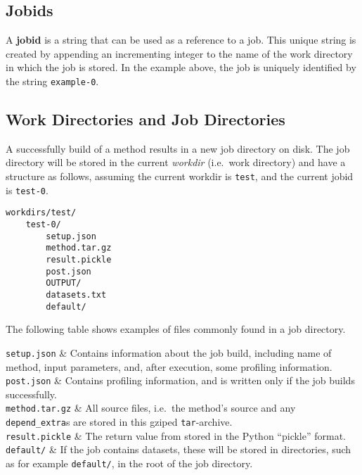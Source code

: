 \subsection{Jobids}
A \textbf{jobid} is a string that can be used as a reference to a job.
This unique string is created by appending an incrementing integer to
the name of the work directory in which the job is stored.  In the
example above, the job is uniquely identified by the
string \texttt{example-0}.



\subsection{Work Directories and Job Directories}
\label{sec:job_directories}
A successfully build of a method results in a new job directory on
disk.  The job directory will be stored in the
current \textsl{workdir} (i.e.\ work directory) and have a structure
as follows, assuming the current workdir is
\texttt{test}, and the current jobid is \texttt{test-0}.
\begin{verbatim}
workdirs/test/
    test-0/
        setup.json
        method.tar.gz
        result.pickle
        post.json
        OUTPUT/
        datasets.txt
        default/
\end{verbatim}
The following table shows examples of files commonly found in a job
directory.

\starttabletwo

\texttt{setup.json} & Contains information about the job build,
including name of method, input parameters, and, after execution, some
profiling information.\\

\texttt{post.json} & Contains profiling information, and is written
only if the job builds successfully.\\

\texttt{method.tar.gz} & All source files, i.e.\ the method's source
and any \texttt{depend\_extra}s are stored in this gziped
\texttt{tar}-archive.\\

\texttt{result.pickle} & The return value from \synthesis stored in the
Python ``pickle'' format.\\

\texttt{default/} & If the job contains datasets, these will be stored
in directories, such as for example \texttt{default/}, in the root of
the job directory.\\

